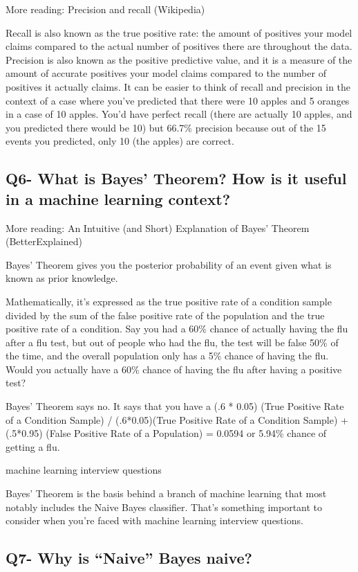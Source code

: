 \documentclass[11pt,a4paper]{article}
\begin{document}
More reading: Precision and recall (Wikipedia)

Recall is also known as the true positive rate: the amount of positives your model claims compared to the actual number of positives there are throughout the data. Precision is also known as the positive predictive value, and it is a measure of the amount of accurate positives your model claims compared to the number of positives it actually claims. It can be easier to think of recall and precision in the context of a case where you’ve predicted that there were 10 apples and 5 oranges in a case of 10 apples. You’d have perfect recall (there are actually 10 apples, and you predicted there would be 10) but 66.7\% precision because out of the 15 events you predicted, only 10 (the apples) are correct.

\subsection{Q6- What is Bayes’ Theorem? How is it useful in a machine learning context?}

More reading: An Intuitive (and Short) Explanation of Bayes’ Theorem (BetterExplained)

Bayes’ Theorem gives you the posterior probability of an event given what is known as prior knowledge.

Mathematically, it’s expressed as the true positive rate of a condition sample divided by the sum of the false positive rate of the population and the true positive rate of a condition. Say you had a 60\% chance of actually having the flu after a flu test, but out of people who had the flu, the test will be false 50\% of the time, and the overall population only has a 5\% chance of having the flu. Would you actually have a 60\% chance of having the flu after having a positive test?

Bayes’ Theorem says no. It says that you have a (.6 * 0.05) (True Positive Rate of a Condition Sample) / (.6*0.05)(True Positive Rate of a Condition Sample) + (.5*0.95) (False Positive Rate of a Population)  = 0.0594 or 5.94\% chance of getting a flu.

machine learning interview questions

Bayes’ Theorem is the basis behind a branch of machine learning that most notably includes the Naive Bayes classifier. That’s something important to consider when you’re faced with machine learning interview questions.

\subsection{Q7- Why is “Naive” Bayes naive?}
\end{document}
